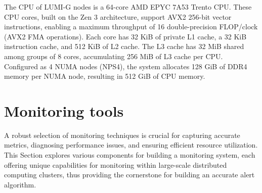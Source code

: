 The CPU of LUMI-G nodes is a 64-core AMD EPYC 7A53 Trento CPU. These CPU cores, built on the Zen 3 architecture, support AVX2 256-bit vector instructions, enabling a maximum throughput of 16 double-precision FLOP/clock (AVX2 FMA operations). Each core has 32 KiB of private L1 cache, a 32 KiB instruction cache, and 512 KiB of L2 cache. The L3 cache has 32 MiB shared among groups of 8 cores, accumulating 256 MiB of L3 cache per CPU. Configured as 4 NUMA nodes (NPS4), the system allocates 128 GiB of DDR4 memory per NUMA node, resulting in 512 GiB of CPU memory.






\section{Monitoring tools}
A robust selection of monitoring techniques is crucial for capturing accurate metrics, diagnosing performance issues, and ensuring efficient resource utilization. This Section explores various components for building a monitoring system, each offering unique capabilities for monitoring within large-scale distributed computing clusters, thus providing the cornerstone for building an accurate alert algorithm.

